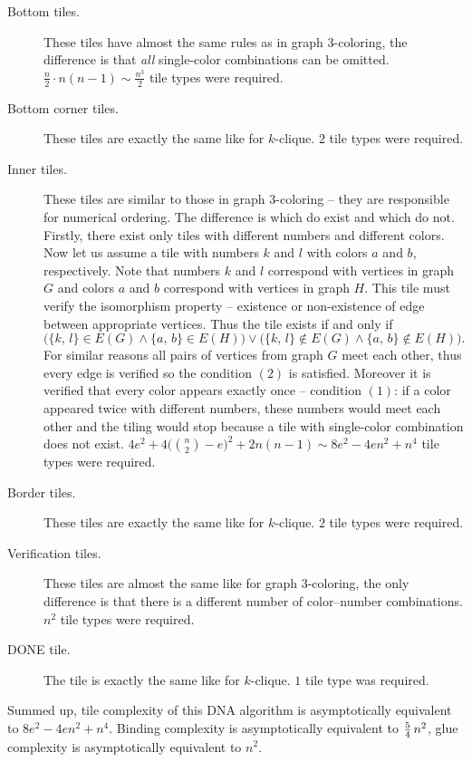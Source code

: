 \begin{description}
	\item[Bottom tiles.] These tiles have almost the same rules as in graph 3-coloring, the difference is that {\em all} single-color combinations can be omitted. $\frac{n}{2} \cdot n(n-1) \sim \frac{n^3}{2}$ tile types were required.
	\item[Bottom corner tiles.] These tiles are exactly the same like for $k$-clique. $2$ tile types were required.
	\item[Inner tiles.] These tiles are similar to those in graph $3$-coloring -- they are responsible for numerical ordering. The difference is which do exist and which do not. Firstly, there exist only tiles with different numbers and different colors. Now let us assume a tile with numbers $k$ and $l$ with colors $a$ and $b$, respectively. Note that numbers $k$ and $l$ correspond with vertices in graph $G$ and colors $a$ and $b$ correspond with vertices in graph $H$. This tile must verify the isomorphism property -- existence or non-existence of edge between appropriate vertices. Thus the tile exists if and only if
	$$\bigl(\{k,\,l\} \in E(G) \wedge \{a,\,b\} \in E(H)\bigr) \vee \bigl(\{k,\,l\} \notin E(G) \wedge \{a,\,b\} \notin E(H)\bigr) . $$
	For similar reasons all pairs of vertices from graph $G$ meet each other, thus every edge is verified so the condition $(2)$ is satisfied. Moreover it is verified that every color appears exactly once -- condition $(1)$: if a color appeared twice with different numbers, these numbers would meet each other and the tiling would stop because a tile with single-color combination does not exist. $4e^2 + 4\bigl(\binom{n}{2}-e\bigr)^2 + 2n(n-1) \sim 8e^2 - 4en^2 + n^4$ tile types were required.
	\item[Border tiles.] These tiles are exactly the same like for $k$-clique. $2$ tile types were required.
	\item[Verification tiles.] These tiles are almost the same like for graph $3$-coloring, the only difference is that there is a different number of color--number combinations. $n^2$ tile types were required.
	\item[DONE tile.] The tile is exactly the same like for $k$-clique. $1$ tile type was required.
\end{description}

Summed up, tile complexity of this DNA algorithm is asymptotically equivalent to $8e^2 - 4en^2 + n^4$. Binding complexity is asymptotically equivalent to $\nicefrac{5}{4}\,n^2$, glue complexity is asymptotically equivalent to $n^2$.

